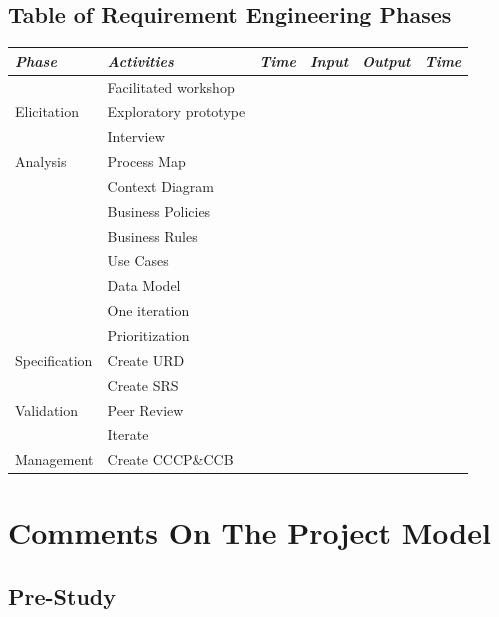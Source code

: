\documentclass[a4paper]{article}
\begin{document}
\subsection{Table of Requirement Engineering Phases}
\begin{table}[!ht]
	\centering
	\begin{tabular}{|p{2cm}| p{4cm} |l| p{2cm} | p{1cm}| p{1cm}|}
	\hline
		\textit{Phase} & \textit{Activities} &  \textit{Time} &\textit{Input} & \textit{Output} & \textit{Time} \\
	\hline
		 		  & Facilitated workshop & & & &\\ \cline{2-3}
		Elicitation & Exploratory prototype & & & &\\ \cline{2-3}
				  & Interview & & & &\\ \cline{2-3} 
				  \hline
		Analysis & Process Map & & & &\\ \cline{2-3}
				 & Context Diagram & & & &\\ \cline{2-3}
				 & Business Policies & & & &\\ \cline{2-3}
				 & Business Rules & & & &\\ \cline{2-3}
				 & Use Cases & & & &\\ \cline{2-3}
				 & Data Model & & & &\\ \cline{2-3}
				 & One iteration  & & & &\\ \cline{2-3}
				 & Prioritization & & & &\\ \cline{2-3} 
				 \hline
		Specification & Create URD & & & &\\ \cline{2-3}
				 & Create SRS & & & &\\ \cline{2-3}
				 \hline
		Validation & Peer Review& & & &\\ \cline{2-3}
				 & Iterate & & & &\\ \cline{2-3}
				 \hline
		Management & Create CCCP\&CCB & & & &\\ \cline{2-3} 
		\hline
	
	\end{tabular}
\end{table}

\section{Comments On The Project Model} 
\label{sec:comments_on_the_project_model}

\subsection{Pre-Study}
\label{sub:pre_study}
\end{document}
